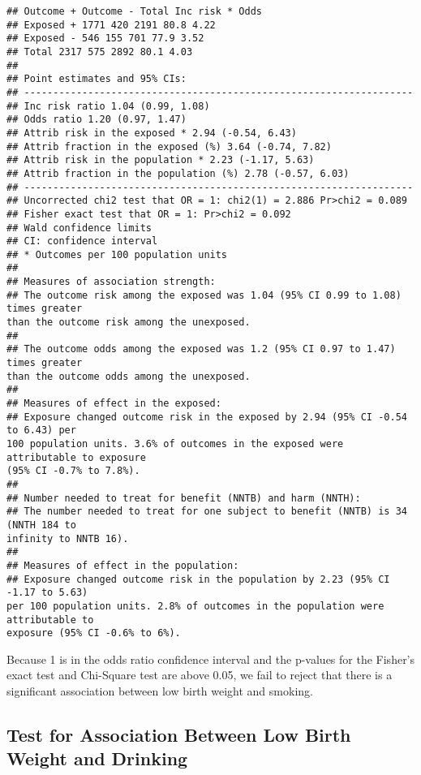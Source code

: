 \documentclass[
]{article}
\begin{document}
\begin{verbatim}
## Outcome + Outcome - Total Inc risk * Odds
## Exposed + 1771 420 2191 80.8 4.22
## Exposed - 546 155 701 77.9 3.52
## Total 2317 575 2892 80.1 4.03
##
## Point estimates and 95% CIs:
## -------------------------------------------------------------------
## Inc risk ratio 1.04 (0.99, 1.08)
## Odds ratio 1.20 (0.97, 1.47)
## Attrib risk in the exposed * 2.94 (-0.54, 6.43)
## Attrib fraction in the exposed (%) 3.64 (-0.74, 7.82)
## Attrib risk in the population * 2.23 (-1.17, 5.63)
## Attrib fraction in the population (%) 2.78 (-0.57, 6.03)
## -------------------------------------------------------------------
## Uncorrected chi2 test that OR = 1: chi2(1) = 2.886 Pr>chi2 = 0.089
## Fisher exact test that OR = 1: Pr>chi2 = 0.092
## Wald confidence limits
## CI: confidence interval
## * Outcomes per 100 population units
##
## Measures of association strength:
## The outcome risk among the exposed was 1.04 (95% CI 0.99 to 1.08) times greater
than the outcome risk among the unexposed.
##
## The outcome odds among the exposed was 1.2 (95% CI 0.97 to 1.47) times greater
than the outcome odds among the unexposed.
##
## Measures of effect in the exposed:
## Exposure changed outcome risk in the exposed by 2.94 (95% CI -0.54 to 6.43) per
100 population units. 3.6% of outcomes in the exposed were attributable to exposure
(95% CI -0.7% to 7.8%).
##
## Number needed to treat for benefit (NNTB) and harm (NNTH):
## The number needed to treat for one subject to benefit (NNTB) is 34 (NNTH 184 to
infinity to NNTB 16).
##
## Measures of effect in the population:
## Exposure changed outcome risk in the population by 2.23 (95% CI -1.17 to 5.63)
per 100 population units. 2.8% of outcomes in the population were attributable to
exposure (95% CI -0.6% to 6%).
\end{verbatim}

Because 1 is in the odds ratio confidence interval and the p-values for
the Fisher's exact test and Chi-Square test are above 0.05, we fail to
reject that there is a significant association between low birth weight
and smoking.

\hypertarget{test-for-association-between-low-birth-weight-and-drinking}{%
\subsection{Test for Association Between Low Birth Weight and
Drinking}\label{test-for-association-between-low-birth-weight-and-drinking}}
\end{document}
